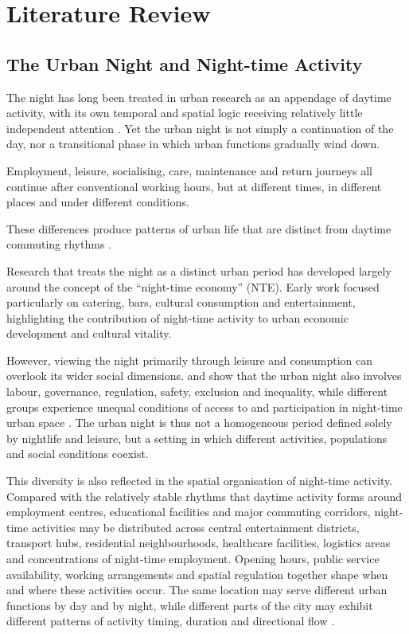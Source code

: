 \chapter{Literature Review}
\label{chapterlabel2}

\section{The Urban Night and Night-time Activity}

The night has long been treated in urban research as an appendage of daytime activity, with its own temporal and spatial logic receiving relatively little independent attention \citep{VanLiempt2015}. Yet the urban night is not simply a continuation of the day, nor a transitional phase in which urban functions gradually wind down.

Employment, leisure, socialising, care, maintenance and return journeys all continue after conventional working hours, but at different times, in different places and under different conditions.

These differences produce patterns of urban life that are distinct from daytime commuting rhythms \citep{Schwanen2012,VanLiempt2015}.

Research that treats the night as a distinct urban period has developed largely around the concept of the ``night-time economy'' (NTE). Early work focused particularly on catering, bars, cultural consumption and entertainment, highlighting the contribution of night-time activity to urban economic development and cultural vitality.

However, viewing the night primarily through leisure and consumption can overlook its wider social dimensions. \citet{Shaw2010,Shaw2014} and \citet{Hadfield2015} show that the urban night also involves labour, governance, regulation, safety, exclusion and inequality, while different groups experience unequal conditions of access to and participation in night-time urban space \citep{Plyushteva2019}. The urban night is thus not a homogeneous period defined solely by nightlife and leisure, but a setting in which different activities, populations and social conditions coexist.

This diversity is also reflected in the spatial organisation of night-time activity. Compared with the relatively stable rhythms that daytime activity forms around employment centres, educational facilities and major commuting corridors, night-time activities may be distributed across central entertainment districts, transport hubs, residential neighbourhoods, healthcare facilities, logistics areas and concentrations of night-time employment. Opening hours, public service availability, working arrangements and spatial regulation together shape when and where these activities occur. The same location may serve different urban functions by day and by night, while different parts of the city may exhibit different patterns of activity timing, duration and directional flow \citep{Schwanen2012,Kim2020,Shaw2022}.

